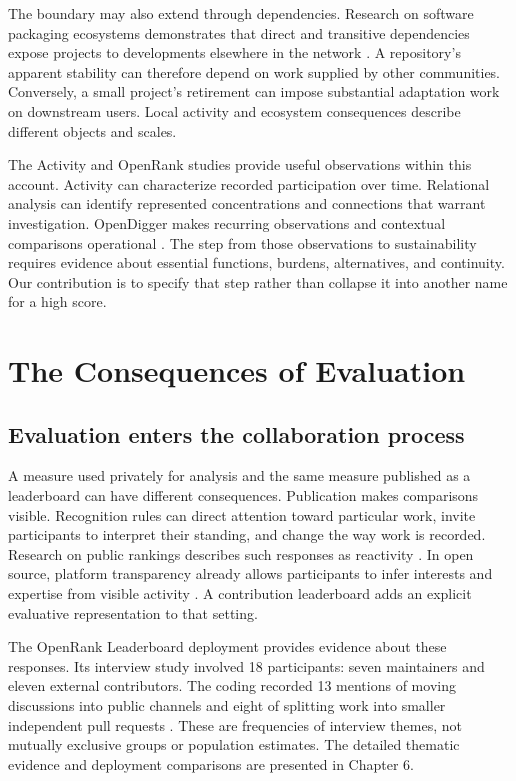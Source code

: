 The boundary may also extend through dependencies. Research on software packaging ecosystems demonstrates that direct and transitive dependencies expose projects to developments elsewhere in the network \citep{decan2019}. A repository's apparent stability can therefore depend on work supplied by other communities. Conversely, a small project's retirement can impose substantial adaptation work on downstream users. Local activity and ecosystem consequences describe different objects and scales.

The Activity and OpenRank studies provide useful observations within this account. Activity can characterize recorded participation over time. Relational analysis can identify represented concentrations and connections that warrant investigation. OpenDigger makes recurring observations and contextual comparisons operational \citep{wang2026digger}. The step from those observations to sustainability requires evidence about essential functions, burdens, alternatives, and continuity. Our contribution is to specify that step rather than collapse it into another name for a high score.

\section{The Consequences of Evaluation}
\label{sec:ch2-consequences}

\subsection{Evaluation enters the collaboration process}
A measure used privately for analysis and the same measure published as a leaderboard can have different consequences. Publication makes comparisons visible. Recognition rules can direct attention toward particular work, invite participants to interpret their standing, and change the way work is recorded. Research on public rankings describes such responses as reactivity \citep{espeland2007}. In open source, platform transparency already allows participants to infer interests and expertise from visible activity \citep{dabbish2012}. A contribution leaderboard adds an explicit evaluative representation to that setting.

The OpenRank Leaderboard deployment provides evidence about these responses. Its interview study involved 18 participants: seven maintainers and eleven external contributors. The coding recorded 13 mentions of moving discussions into public channels and eight of splitting work into smaller independent pull requests \citep[Section 4.2]{zhao2024}. These are frequencies of interview themes, not mutually exclusive groups or population estimates. The detailed thematic evidence and deployment comparisons are presented in Chapter 6.

